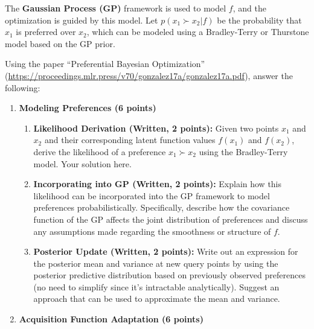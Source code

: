 \documentclass[
  letterpaper,
  numbers=noenddot,
  DIV=11]{scrreprt}
\theoremstyle{plain}
\theoremstyle{definition}
\theoremstyle{remark}
\begin{document}
The \textbf{Gaussian Process (GP)} framework is used to model \(f\), and
the optimization is guided by this model. Let \(p(x_1 \succ x_2 | f)\)
be the probability that \(x_1\) is preferred over \(x_2\), which can be
modeled using a Bradley-Terry or Thurstone model based on the GP prior.

Using the paper ``Preferential Bayesian Optimization''
(\url{https://proceedings.mlr.press/v70/gonzalez17a/gonzalez17a.pdf}),
answer the following:

\begin{enumerate}
\def\labelenumi{(\alph{enumi})}
\item
  \textbf{Modeling Preferences (6 points)}

  \begin{enumerate}
  \def\labelenumii{(\roman{enumii})}
  \item
    \textbf{Likelihood Derivation (Written, 2 points):} Given two points
    \(x_1\) and \(x_2\) and their corresponding latent function values
    \(f(x_1)\) and \(f(x_2)\), derive the likelihood of a preference
    \(x_1 \succ x_2\) using the Bradley-Terry model. Your solution here.
  \item
    \textbf{Incorporating into GP (Written, 2 points):} Explain how this
    likelihood can be incorporated into the GP framework to model
    preferences probabilistically. Specifically, describe how the
    covariance function of the GP affects the joint distribution of
    preferences and discuss any assumptions made regarding the
    smoothness or structure of \(f\).
  \item
    \textbf{Posterior Update (Written, 2 points):} Write out an
    expression for the posterior mean and variance at new query points
    by using the posterior predictive distribution based on previously
    observed preferences (no need to simplify since it's intractable
    analytically). Suggest an approach that can be used to approximate
    the mean and variance.
  \end{enumerate}
\item
  \textbf{Acquisition Function Adaptation (6 points)}


\end{enumerate}
\end{document}

